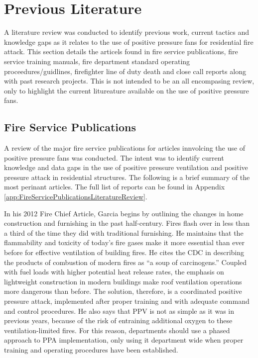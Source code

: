 \documentclass{article}
\begin{document}
\clearpage

\section{Previous Literature}
A literature review was conducted to identify previous work, current tactics and knowledge gaps as it relates to the use of positive pressure fans for residential fire attack. This section details the articels found in fire service publications, fire service training manuals, fire department standard operating proceedures/guidlines, firefighter line of duty death and close call reports along with past research projects. This is not intended to be an all encompasing review, only to highlight the current litureature available on the use of positive pressure fans. 

\subsection{Fire Service Publications}
A review of the major fire service publications for articles innvolcing the use of positive pressure fans was conducted. The intent was to identify current knowledge and data gaps in the use of positive pressure ventilation and positive pressure attack in residential structures. The following is a brief summary of the most perinant articles. The full list of reports can be found in Appendix \ref{app:FireServicePublicationsLiteratureReview}. 

In his 2012 Fire Chief Article, Garcia begins by outlining the changes in home construction and furnishing in the past half-century. Fires flash over in less than a third of the time they did with traditional furnishing. He maintains that the flammability and toxicity of today’s fire gases make it more essential than ever before for effective ventilation of building fires. He cites the CDC in describing the products of combustion of modern fires as “a soup of carcinogens.” Coupled with fuel loads with higher potential heat release rates, the emphasis on lightweight construction in modern buildings make roof ventilation operations more dangerous than before. The solution, therefore, is a coordinated positive pressure attack, implemented after proper training and with adequate command and control procedures. He also says that PPV is not as simple as it was in previous years, because of the risk of entraining additional oxygen to these ventilation-limited fires. For this reason, departments should use a phased approach to PPA implementation, only using it department wide when proper training and operating procedures have been established.\cite{GarciaPPVatStructures}
\end{document}
